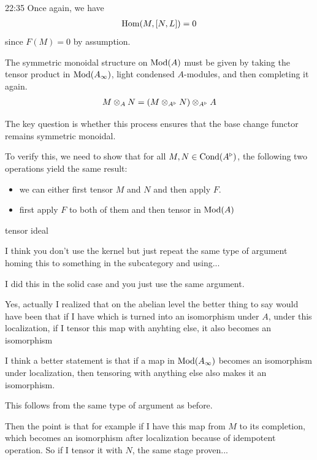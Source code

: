 \begin{unfinished}{22:35}
Once again, we have
\begin{align*}
\operatorname{Hom}(M, [N,L]) = 0
\end{align*}
since $F(M) = 0$ by assumption.

The symmetric monoidal structure on $\operatorname{Mod}(A)$ must be given by taking the tensor product in $\operatorname{Mod}(A_\infty)$, light condensed $A$-modules, and then completing it again. 
\begin{align*}
M \otimes_A N = (M \otimes_{A^\triangleright} N) \otimes_{A^\triangleright} A
\end{align*}

The key question is whether this process ensures that the base change functor remains symmetric monoidal.

To verify this, we need to show that for all $M,N \in \mathrm{Cond}(A^\triangleright)$, the following two operations yield the same result:
\begin{itemize}
\item we can either first tensor $M$ and $N$ and then apply $F$.
\item first apply $F$ to both of them and then tensor in $\operatorname{Mod}(A)$
\end{itemize}


tensor ideal

\gabber I think you don't use the kernel but just repeat the same type of argument homing this to something in the subcategory and using...

\scholze I did this in the solid case and you just use the same argument.

Yes, actually I realized that on the abelian level the better thing to say would have been that if I have which is turned into an isomorphism under $A$, under this localization, if I tensor this map with anyhting else, it also becomes an isomorphism 

I think a better statement is that if a map in $\operatorname{Mod}(A_\infty)$ becomes an isomorphism under localization, then tensoring with anything else also makes it an isomorphism. 

This follows from the same type of argument as before.

Then the point is that for example if I have this map from $M$ to its completion, which becomes an isomorphism after localization because of idempotent operation. So if I tensor it with $N$, the same stage proven... 



\end{unfinished}
